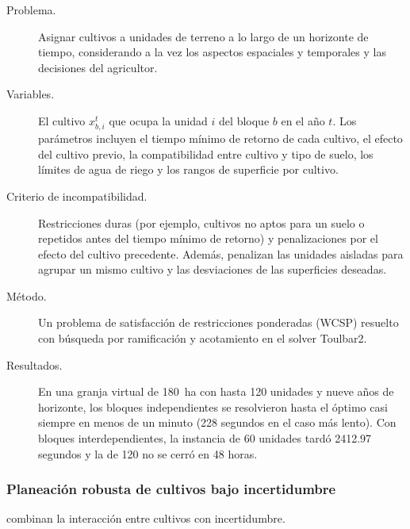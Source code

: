 \documentclass[11pt]{article}
\begin{document}
\begin{description}
  \item[Problema.] Asignar cultivos a unidades de terreno a lo largo de un horizonte de tiempo, considerando a la vez los aspectos espaciales y temporales y las decisiones del agricultor.
  \item[Variables.] El cultivo $x^{t}_{b,i}$ que ocupa la unidad $i$ del bloque $b$ en el año $t$. Los parámetros incluyen el tiempo mínimo de retorno de cada cultivo, el efecto del cultivo previo, la compatibilidad entre cultivo y tipo de suelo, los límites de agua de riego y los rangos de superficie por cultivo.
  \item[Criterio de incompatibilidad.] Restricciones duras (por ejemplo, cultivos no aptos para un suelo o repetidos antes del tiempo mínimo de retorno) y penalizaciones por el efecto del cultivo precedente. Además, penalizan las unidades aisladas para agrupar un mismo cultivo y las desviaciones de las superficies deseadas.
  \item[Método.] Un problema de satisfacción de restricciones ponderadas (WCSP) resuelto con búsqueda por ramificación y acotamiento en el solver Toulbar2.
  \item[Resultados.] En una granja virtual de 180~ha con hasta 120 unidades y nueve años de horizonte, los bloques independientes se resolvieron hasta el óptimo casi siempre en menos de un minuto (228 segundos en el caso más lento). Con bloques interdependientes, la instancia de 60 unidades tardó 2412.97 segundos y la de 120 no se cerró en 48 horas.
\end{description}

\subsubsection{Planeación robusta de cultivos bajo incertidumbre}

\textcite{liu2026} combinan la interacción entre cultivos con incertidumbre.
\end{document}
